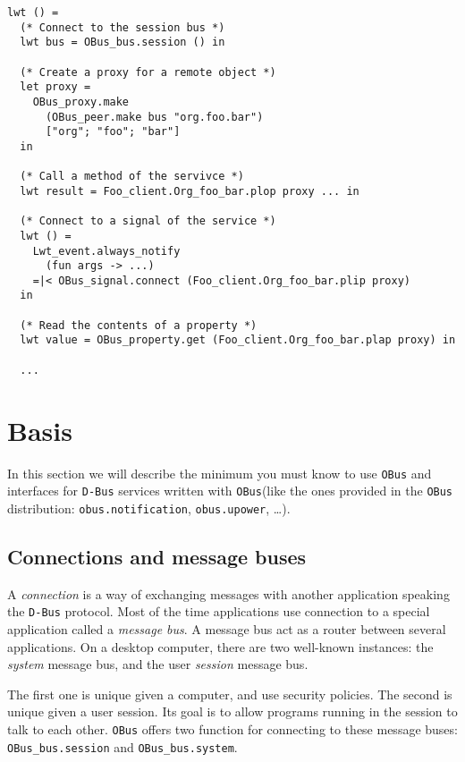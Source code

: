 \documentclass{article}
\newcommand{\obus}{\texttt{OBus}\xspace}
\newcommand{\dbus}{\texttt{D-Bus}\xspace}
\begin{document}
\lstset{language=[Objective]Caml}
\begin{lstlisting}
lwt () =
  (* Connect to the session bus *)
  lwt bus = OBus_bus.session () in

  (* Create a proxy for a remote object *)
  let proxy =
    OBus_proxy.make
      (OBus_peer.make bus "org.foo.bar")
      ["org"; "foo"; "bar"]
  in

  (* Call a method of the servivce *)
  lwt result = Foo_client.Org_foo_bar.plop proxy ... in

  (* Connect to a signal of the service *)
  lwt () =
    Lwt_event.always_notify
      (fun args -> ...)
    =|< OBus_signal.connect (Foo_client.Org_foo_bar.plip proxy)
  in

  (* Read the contents of a property *)
  lwt value = OBus_property.get (Foo_client.Org_foo_bar.plap proxy) in

  ...
\end{lstlisting}

\section{Basis}

In this section we will describe the minimum you must know to use
\obus and interfaces for \dbus services written with \obus (like the
ones provided in the \obus distribution: \texttt{obus.notification},
\texttt{obus.upower}, \dots).

\subsection{Connections and message buses}

A \emph{connection} is a way of exchanging messages with another
application speaking the \dbus protocol. Most of the time applications
use connection to a special application called a \emph{message bus}. A
message bus act as a router between several applications. On a desktop
computer, there are two well-known instances: the \emph{system}
message bus, and the user \emph{session} message bus.

The first one is unique given a computer, and use security
policies. The second is unique given a user session. Its goal is to
allow programs running in the session to talk to each other. \obus
offers two function for connecting to these message buses:
\texttt{OBus\_bus.session} and \texttt{OBus\_bus.system}.
\end{document}
